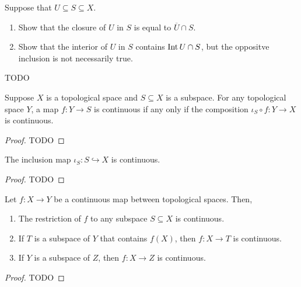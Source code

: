 \begin{exercise}
	\begin{problem}
	Suppose that $ U \subseteq S \subseteq X $.
	\begin{enumerate}
		\item Show that the closure of $ U $ in $ S $ is equal to $ \overline{U}\cap S $.
		\item Show that the interior of $ U $ in $ S $ contains $ \operatorname{Int}{U} \cap S $, but the oppositve inclusion is not necessarily true.
	\end{enumerate}
	\end{problem}
	\begin{solution}
		TODO
	\end{solution}
\end{exercise}

\begin{theorem}
	Suppose $ X $ is a topological space and $ S \subseteq X $ is a subspace. For any topological space $ Y $, a map $ f:Y \to S $ is continuous if any only if the composition $ \iota_{S}\circ f:Y \to X $ is continuous.
	\begin{proof}
		TODO
	\end{proof}
\end{theorem}

\begin{corollary}
	The inclusion map $ \iota_{S}:S \hookrightarrow X $ is continuous.
	\begin{proof}
		TODO
	\end{proof}
\end{corollary}

\begin{corollary}
	Let $ f:X \to Y $ be a continuous map between topological spaces. Then,
	\begin{enumerate}
		\item The restriction of $ f $ to any subspace $ S \subseteq X $ is continuous.
		\item If $ T $ is a subspace of $ Y $ that contains $ f ( X ) $, then $ f:X \to T $ is continuous.
		\item If $ Y $ is a subspace of $ Z $, then $ f:X \to Z $ is continuous.
	\end{enumerate}
	\begin{proof}
		TODO
	\end{proof}
\end{corollary}

